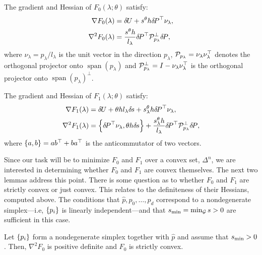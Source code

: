 \documentclass[sisc-eikonal.tex]{subfiles}
\begin{document}
\begin{proposition}\label{prop:F0-grad-and-Hess}
  The gradient and Hessian of $F_0(\lambda; \theta)$ satisfy:
  \begin{align}
    \nabla F_0(\lambda) &= \delU + s^{\theta} h \delP^\top \nu_\lambda,\label{eq:F0-grad} \\
    \nabla^2 F_0(\lambda) &= \frac{s^{\theta} h}{l_\lambda} \delP^\top \calP^\perp_{p_\lambda} \delP,
  \end{align}
  where $\nu_\lambda = p_\lambda/l_\lambda$ is the unit vector in the
  direction $p_\lambda$,
  $\mathcal{P}_{p_\lambda} = \nu_\lambda \nu_\lambda^\top$ denotes the
  orthogonal projector onto $\operatorname{span}(p_\lambda)$ and
  $\mathcal{P}_{p_\lambda}^\perp = I - \nu_\lambda \nu_\lambda^\top$ is the
  orthogonal projector onto $\operatorname{span}(p_\lambda)^\perp$.
\end{proposition}

\begin{proposition}\label{prop:F1-grad-and-Hess}
  The gradient and Hessian of $F_1(\lambda; \theta)$ satisfy:
  \begin{align}
    \nabla F_1(\lambda) &= \delU + \theta h l_\lambda \dels + s^{\theta}_\lambda h \delP^\top \nu_\lambda, \\
    \nabla^2 F_1(\lambda) &= \set{\delP^\top \nu_\lambda, \theta h \dels} + \frac{s^\theta_\lambda h}{l_\lambda} \delP^\top \calP^\perp_{p_\lambda} \delP, \label{eq:hess-F1}
  \end{align}
  where $\left\{a, b\right\} = ab^\top + ba^\top$ is the anticommutator of two
  vectors.
\end{proposition}

Since our task will be to minimize $F_0$ and $F_1$ over a convex set,
$\Delta^n$, we are interested in determining whether $F_0$ and $F_1$
are convex themselves. The next two lemmas address this point. There
is some question as to whether $F_0$ and $F_1$ are strictly convex or
just convex. This relates to the definiteness of their Hessians,
computed above. The conditions that $\hat{p}, p_0, \hdots, p_d$
correspond to a nondegenerate simplex---i.e, $\left\{p_i\right\}$ is linearly
independent---and that $s_{\operatorname{min}} = \min_{\mathcal{G}} s > 0$ are sufficient in
this case.

\begin{lemma}\label{lemma:dPt-cprojp-dP-pd}
  Let $\left\{p_i\right\}$ form a nondegenerate simplex together with $\hat{p}$
  and assume that $s_{\operatorname{min}} > 0$. Then, $\nabla^2 F_0$ is positive
  definite and $F_0$ is strictly convex.
\end{lemma}
\end{document}
